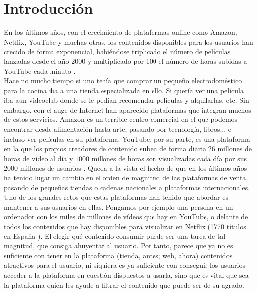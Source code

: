 \chapter{Introducción}\label{chap:introduccion}

En los últimos años, con el crecimiento de plataformas online como Amazon, Netflix, YouTube y muchas otras, los contenidos disponibles para los usuarios han crecido de forma exponencial, habiéndose triplicado el número de películas lanzadas desde el año 2000 \cite{watson_2020} y multiplicado por 100 el número de horas subidas a YouTube cada minuto \cite{clement_2019}. \\

Hace no mucho tiempo si uno tenía que comprar un pequeño electrodoméstico para la cocina iba a una tienda especializada en ello. Si quería ver una película iba aun videoclub donde se le podían recomendar películas y alquilarlas, etc. Sin embargo, con el auge de Internet han aparecido plataformas que integran muchos de estos servicios. Amazon es un terrible centro comercial en el que podemos encontrar desde alimentación hasta arte, pasando por tecnología, libros... e incluso ver películas en su plataforma. YouTube, por su parte, es una plataforma en la que los propios creadores de contenido suben de forma diaria $26$ millones de horas de vídeo al día y $1000$ millones de horas son visualizadas cada día por sus $2000$ millones de usuarios \cite{YoutubeStats}. Queda a la vista el hecho de que en los últimos años ha tenido lugar un cambio en el orden de magnitud de las plataformas de venta, pasando de pequeñas tiendas o cadenas nacionales a plataformas internacionales.\\

Uno de los grandes retos que estas plataformas han tenido que abordar es mantener a sus usuarios en ellas. Pongamos por ejemplo una persona en un ordenador con los miles de millones de vídeos que hay en YouTube, o delante de todos los contenidos que hay disponibles para visualizar en Netflix (1770 títulos en España \cite{Lovely2019}). El elegir qué contenido consumir puede ser una tarea de tal magnitud, que consiga ahuyentar al usuario. Por tanto, parece que ya no es suficiente con tener en la plataforma (tienda, antes; web, ahora) contenidos atractivos para el usuario, ni siquiera es ya suficiente con conseguir los usuarios acceder a la plataforma en cuestión dispuestos a usarla, sino que es vital que sea la plataforma quien les ayude a filtrar el contenido que puede ser de su agrado.\\


